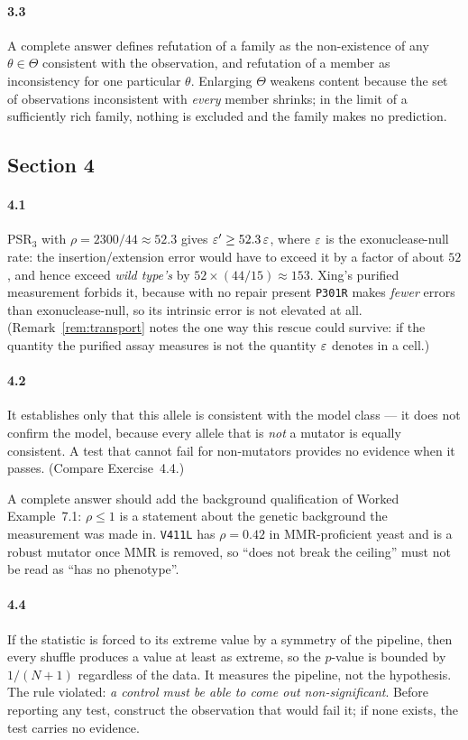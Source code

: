 \paragraph{3.3}
A complete answer defines refutation of a family as the non-existence of any
$\theta \in \Theta$ consistent with the observation, and refutation of a member
as inconsistency for one particular $\theta$. Enlarging $\Theta$ weakens content
because the set of observations inconsistent with \emph{every} member shrinks;
in the limit of a sufficiently rich family, nothing is excluded and the family
makes no prediction.

\subsection*{Section 4}

\paragraph{4.1}
PSR$_3$ with $\rho = 2300/44 \approx 52.3$ gives
$\varepsilon' \ge 52.3\,\varepsilon$, where $\varepsilon$ is the exonuclease-null rate: the
insertion/extension error would have to exceed it by a factor of about $52$, and
hence exceed \emph{wild type's} by $52 \times (44/15) \approx 153$. Xing's
purified measurement forbids it, because with no repair present \texttt{P301R}
makes \emph{fewer} errors than exonuclease-null, so its intrinsic error is not
elevated at all. (Remark~\ref{rem:transport} notes the one way this rescue could
survive: if the quantity the purified assay measures is not the quantity
$\varepsilon$ denotes in a cell.)

\paragraph{4.2}
It establishes only that this allele is consistent with the model class --- it
does not confirm the model, because every allele that is \emph{not} a mutator is
equally consistent. A test that cannot fail for non-mutators provides no evidence
when it passes. (Compare Exercise~4.4.)

A complete answer should add the background qualification of Worked
Example~7.1: $\rho \le 1$ is a statement about the genetic background the
measurement was made in. \texttt{V411L} has $\rho = 0.42$ in MMR-proficient
yeast and is a robust mutator once MMR is removed, so ``does not break the
ceiling'' must not be read as ``has no phenotype''.

\paragraph{4.4}
If the statistic is forced to its extreme value by a symmetry of the pipeline,
then every shuffle produces a value at least as extreme, so the $p$-value is
bounded by $1/(N+1)$ regardless of the data. It measures the pipeline, not the
hypothesis. The rule violated: \emph{a control must be able to come out
non-significant}. Before reporting any test, construct the observation that would
fail it; if none exists, the test carries no evidence.

